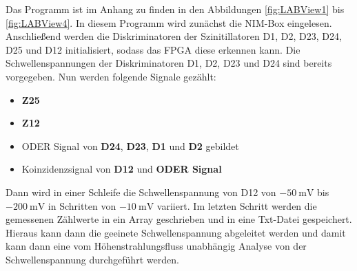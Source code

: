 \documentclass{article}
\begin{document}
Das Programm ist im Anhang zu finden in den Abbildungen \ref{fig:LABView1} bis \ref{fig:LABView4}.
In diesem Programm wird zunächst die NIM-Box eingelesen. Anschließend werden die Diskriminatoren der Szinitillatoren D1, D2, D23, D24, D25 und D12 initialisiert, sodass das FPGA diese erkennen kann.	
Die Schwellenspannungen der Diskriminatoren D1, D2, D23 und D24 sind bereits vorgegeben.
Nun werden folgende Signale gezählt:
\begin{itemize}
    \item \textbf{Z25}
    \item \textbf{Z12}
    \item ODER Signal von \textbf{D24}, \textbf{D23}, \textbf{D1} und \textbf{D2} gebildet	
    \item Koinzidenzsignal von \textbf{D12} und \textbf{ODER Signal}  	
\end{itemize}
Dann wird in einer Schleife die Schwellenspannung von D12 von $\SI{-50}{\milli\volt}$ bis $\SI{-200}{\milli\volt}$ in Schritten von $\SI{-10}{\milli\volt}$ variiert.
Im letzten Schritt werden die gemessenen Zählwerte in ein Array geschrieben und in eine Txt-Datei gespeichert.
Hieraus kann dann die geeinete Schwellenspannung abgeleitet werden und
damit kann dann eine vom Höhenstrahlungsfluss unabhängig Analyse von der Schwellenspannung durchgeführt werden.
\end{document}

